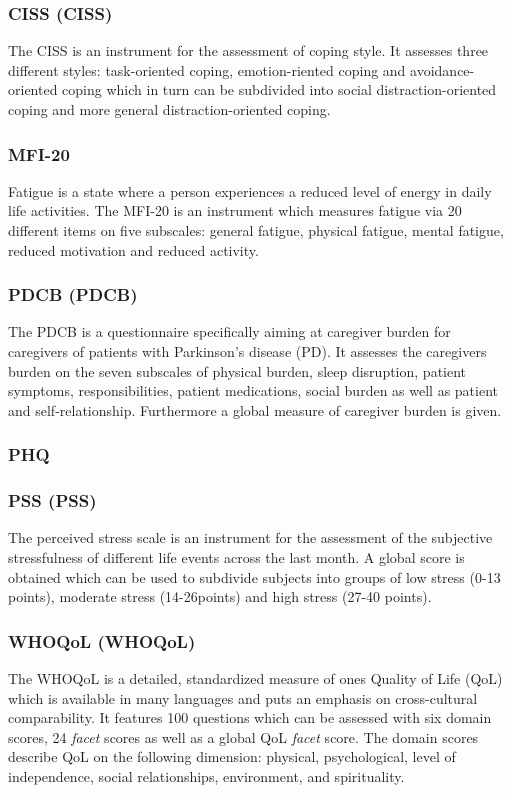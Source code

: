 \subsubsection{\acl{CISS} (\acs{CISS})}
The \ac{CISS} is an instrument for the assessment of coping style. It assesses three different styles: task-oriented coping, emotion-riented coping and avoidance-oriented coping which in turn can be subdivided into social distraction-oriented coping and more general distraction-oriented coping.

\subsubsection{\acl{MFI-20}}
Fatigue is a state where a person experiences a reduced level of energy in daily life activities. The \ac{MFI-20} is an instrument which measures fatigue via 20 different items on five subscales: general fatigue, physical fatigue, mental fatigue, reduced motivation and reduced activity.

\subsubsection{\acl{PDCB} (\acs{PDCB})}
The \ac{PDCB} is a questionnaire specifically aiming at caregiver burden for caregivers of patients with Parkinson's disease (PD). It assesses the caregivers burden on the seven subscales of physical burden, sleep disruption, patient symptoms, responsibilities, patient medications, social burden as well as patient and self-relationship. Furthermore a global measure of caregiver burden is given. 

\subsubsection{\acl{PHQ}}

\subsubsection{\acl{PSS} (\acs{PSS})}
The perceived stress scale is an instrument for the assessment of the subjective stressfulness of different life events across the last month. A global score is obtained which can be used to subdivide subjects into groups of low stress (0-13 points), moderate stress (14-26points) and high stress (27-40 points).

\subsubsection{\acl{WHOQoL} (\acs{WHOQoL})}
The \ac{WHOQoL} is a detailed, standardized measure of ones Quality of Life (QoL) which is available in many languages and puts an emphasis on cross-cultural comparability. It features 100 questions which can be assessed with six domain scores, 24 \emph{facet} scores as well as a global QoL \emph{facet} score. The domain scores describe QoL on the following dimension: physical, psychological, level of independence, social relationships, environment, and spirituality.

